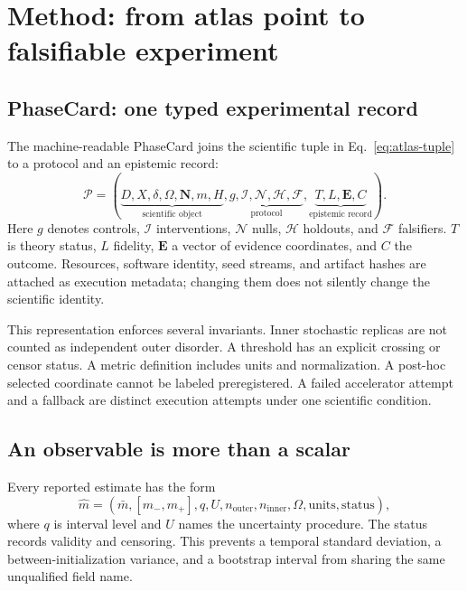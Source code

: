 \section{Method: from atlas point to falsifiable experiment}
\label{sec:method}

\subsection{PhaseCard: one typed experimental record}

The machine-readable PhaseCard joins the scientific tuple in
Eq.~\eqref{eq:atlas-tuple} to a protocol and an epistemic record:
\begin{equation}
  \mathcal P=
  (\underbrace{D,X,\delta,\Omega,\mathbf N,m,H}_{\text{scientific object}},
   \underbrace{g,\mathcal I,\mathcal N,\mathcal H,\mathcal F}_{\text{protocol}},
   \underbrace{T,L,\mathbf E,C}_{\text{epistemic record}}).
  \label{eq:phasecard}
\end{equation}
Here $g$ denotes controls, $\mathcal I$ interventions, $\mathcal N$ nulls,
$\mathcal H$ holdouts, and $\mathcal F$ falsifiers. $T$ is theory status, $L$
fidelity, $\mathbf E$ a vector of evidence coordinates, and $C$ the outcome.
Resources, software identity, seed streams, and artifact hashes are attached as
execution metadata; changing them does not silently change the scientific
identity.

This representation enforces several invariants. Inner stochastic replicas are
not counted as independent outer disorder. A threshold has an explicit crossing
or censor status. A metric definition includes units and normalization. A
post-hoc selected coordinate cannot be labeled preregistered. A failed
accelerator attempt and a fallback are distinct execution attempts under one
scientific condition.

\subsection{An observable is more than a scalar}

Every reported estimate has the form
\begin{equation}
  \widehat m=(\bar m,[m_-,m_+],q,U,n_{\mathrm{outer}},
  n_{\mathrm{inner}},\Omega,\text{units},\text{status}),
  \label{eq:typed-estimate}
\end{equation}
where $q$ is interval level and $U$ names the uncertainty procedure. The status
records validity and censoring. This prevents a temporal standard deviation, a
between-initialization variance, and a bootstrap interval from sharing the same
unqualified field name.

